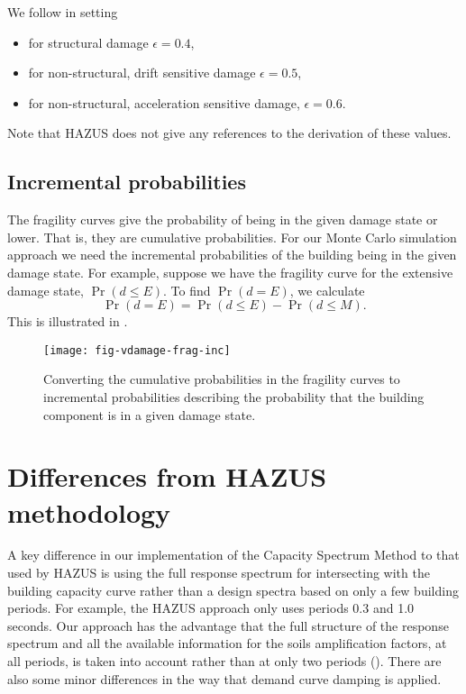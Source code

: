 We follow \cite{dr_FEMA99b} in setting
\begin{itemize}
\item for structural damage $\epsilon=0.4$, \item for
non-structural, drift sensitive damage $\epsilon=0.5$, \item for
non-structural, acceleration sensitive damage,
  $\epsilon=0.6$.
\end{itemize}
Note that HAZUS does not give any references to the derivation of
these values.


\subsection{Incremental probabilities}

The fragility curves give the probability
of being in the given damage state or lower. That is, they are
cumulative probabilities. For our Monte Carlo simulation approach
we need the incremental probabilities of the building being in the
given damage state. For example,  suppose we have the fragility
curve for the extensive damage state,
$\Pr(d \le E)$. To find $\Pr(d=E)$, we calculate
$$
\Pr(d=E) = \Pr(d\le E) - \Pr(d\le M).
$$
This is illustrated in .

\begin{figure}[htp]
\centering
{}
\texttt{[image: fig-vdamage-frag-inc]}
\caption{Converting the cumulative
  probabilities in the fragility curves to incremental probabilities
  describing the probability that the building component is in a given damage state.}
\label{fig:vdamage-frag-inc}
\end{figure}


\section{Differences from HAZUS methodology}


A key difference in our implementation of the Capacity Spectrum
Method to that used by HAZUS is
using the full response spectrum for intersecting with the
building capacity curve rather than a design
spectra based on only a few building periods. For example, the
HAZUS approach only uses periods 0.3 and 1.0 seconds. Our approach
has the advantage that the full structure of the response spectrum
and all the available information for the soils amplification
factors, at all periods, is taken into account rather than at only
two periods (). There are also some
minor differences in the way that demand curve damping is applied.

